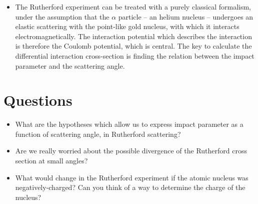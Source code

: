 \begin{itemize}
    \item The Rutherford experiment can be treated with a purely classical formalism, under the assumption that the $\alpha$ particle -- an helium nucleus -- undergoes an elastic scattering with the point-like gold nucleus, with which it interacts electromagnetically. The interaction potential which describes the interaction is therefore the Coulomb potential, which is central. The key to calculate  the differential interaction cross-section is finding the relation between the impact parameter and the scattering angle.
\end{itemize}
\section*{Questions}
\begin{itemize}
    \item What are the hypotheses which allow us to express impact parameter as a function of scattering angle, in Rutherford scattering?
    \item Are we really worried about the possible divergence of the Rutherford cross section at small angles?
    \item What would change in the Rutherford experiment if the atomic nucleus was negatively-charged? Can you think of a way to determine the charge of the nucleus?
\end{itemize}
